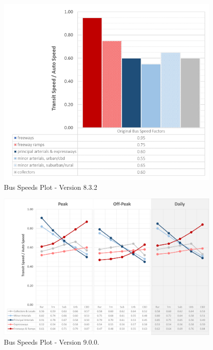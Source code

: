 \documentclass[
  letterpaper,
  DIV=11,
  numbers=noendperiod]{scrreprt}
\begin{document}
\begin{figure}[H]

{\centering \includegraphics{v9x/v900/whats-new/_pictures/old_bus_speeds.png}

}

\caption{\label{fig-pdf-old-bus-speeds-plot}Bus Speeds Plot - Version
8.3.2}

\end{figure}

\begin{figure}[H]

{\centering \includegraphics{v9x/v900/whats-new/_pictures/pdf-bus-speeds-plot.png}

}

\caption{\label{fig-pdf-bus-speeds-plot}Bus Speeds Plot - Version
9.0.0.}

\end{figure}
\end{document}
